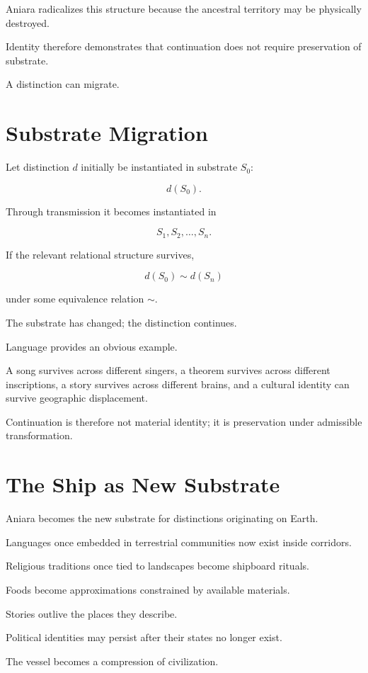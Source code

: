 \documentclass[11pt,oneside]{book}
\theoremstyle{definition}
\theoremstyle{remark}
\begin{document}
Aniara radicalizes this structure because the ancestral territory may be physically destroyed.

Identity therefore demonstrates that continuation does not require preservation of substrate.

A distinction can migrate.

\section{Substrate Migration}

Let distinction \(d\) initially be instantiated in substrate \(S_0\):

\[
d(S_0).
\]

Through transmission it becomes instantiated in

\[
S_1,S_2,\ldots,S_n.
\]

If the relevant relational structure survives,

\[
d(S_0)
\sim
d(S_n)
\]

under some equivalence relation \(\sim\).

The substrate has changed; the distinction continues.

Language provides an obvious example.

A song survives across different singers, a theorem survives across different inscriptions, a story survives across different brains, and a cultural identity can survive geographic displacement.

Continuation is therefore not material identity; it is preservation under admissible transformation.

\section{The Ship as New Substrate}

Aniara becomes the new substrate for distinctions originating on Earth.

Languages once embedded in terrestrial communities now exist inside corridors.

Religious traditions once tied to landscapes become shipboard rituals.

Foods become approximations constrained by available materials.

Stories outlive the places they describe.

Political identities may persist after their states no longer exist.

The vessel becomes a compression of civilization.
\end{document}
